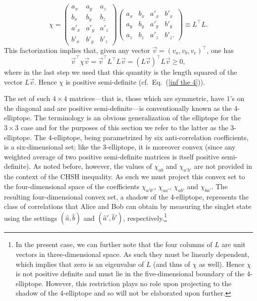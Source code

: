 \begin{equation}
\chi = 
\begin{pmatrix}
a_x & a_y & a_z \\[.2cm]
b_x & b_y & b_z \\[.2cm] 
a'_x & a'_y & a'_z \\[.2cm] 
b'_x & b'_y & b'_z 
\end{pmatrix}
\begin{pmatrix} 
a_x & b_x & a'_x & b'_x \\[.2cm]
a_y & b_y & a'_y & b'_y  \\[.2cm]
a_z & b_z & a'_z & b'_z.  
\end{pmatrix}
\equiv L^\top L.
\end{equation}
This factorization implies that, given any vector $\vec{v}=(v_a,v_b,v_c)^\top$, one has 
\begin{equation}
\vec{v}^\top \! \chi\vec{v} = \vec{v}^\top L^\top L \vec{v} = (L\vec{v})^\top L \vec{v} \geq 0,
\end{equation}
where in the last step we used that this quantity is the length squared of the vector $L\vec{v}$. Hence $\chi$ is positive semi-definite (cf.\ Eq.\ (\ref{inf the 4})).

The set of such $4 \times 4$ matrices---that is, those which are symmetric, have $1$'s on the diagonal and are positive semi-definite---is conventionally known as the 4-elliptope. The terminology is an obvious generalization of the elliptope for the $3 \times 3$ case and for the purposes of this section we refer to the latter as the 3-elliptope. The 4-elliptope, being parametrized by six anti-correlation coefficients, is a six-dimensional set; like the 3-elliptope, it is moreover convex (since any weighted average of two positive semi-definite matrices is itself positive semi-definite). As noted before, however, the values of $\chi_{ab}$ and $\chi_{a'b'}$ are not provided in the context of the CHSH inequality. As such we must project this convex set to the four-dimensional space of the coefficients $\chi_{a'b'}$, $\chi_{aa'}$, $\chi_{ab'}$ and $\chi_{ba'}$. The resulting four-dimensional convex set, a shadow of the 4-elliptope, represents the class of correlations that Alice and Bob can obtain by measuring the singlet state using the settings $(\hat{a}, \hat{b})$ and $(\hat{a}', \hat{b}')$, respectively.\footnote{In the present case, we can further note that the four columns of $L$ are unit vectors in three-dimensional space. As such they must be linearly dependent, which implies that zero is an eigenvalue of $L$ (and thus of $\chi$ as well). Hence $\chi$ is not positive definite and must lie in the five-dimensional boundary of the 4-elliptope. However, this restriction plays no role upon projecting to the shadow of the 4-elliptope and so will not be elaborated upon further.}

